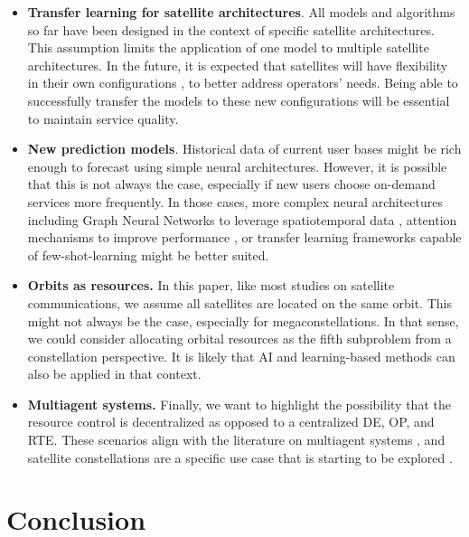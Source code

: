 \documentclass[letterpaper]{article} %
\begin{document}
\begin{itemize}
    \item \textbf{Transfer learning for satellite architectures}. All models and algorithms so far have been designed in the context of specific satellite architectures. This assumption limits the application of one model to multiple satellite architectures. In the future, it is expected that satellites will have flexibility in their own configurations \cite{DeWeck2004OptimalAlgorithm}, to better address operators' needs. Being able to successfully transfer the models to these new configurations will be essential to maintain service quality.
    
    \item \textbf{New prediction models}. Historical data of current user bases might be rich enough to forecast using simple neural architectures. However, it is possible that this is not always the case, especially if new users choose on-demand services more frequently. In those cases, more complex neural architectures including Graph Neural Networks to leverage spatiotemporal data \cite{wang2020traffic}, attention mechanisms to improve performance \cite{Vaswani2017}, or transfer learning frameworks capable of few-shot-learning \cite{Panigrahi2021} might be better suited. 
    
    \item \textbf{Orbits as resources.} In this paper, like most studies on satellite communications, we assume all satellites are located on the same orbit. This might not always be the case, especially for megaconstellations. In that sense, we could consider allocating orbital resources as the fifth subproblem from a constellation perspective. It is likely that AI and learning-based methods can also be applied in that context.
    
    \item \textbf{Multiagent systems.} Finally, we want to highlight the possibility that the resource control is decentralized as opposed to a centralized DE, OP, and RTE. These scenarios align with the literature on multiagent systems \cite{foerster2018counterfactual, Rashid2018}, and satellite constellations are a specific use case that is starting to be explored \cite{he2020load, hu2020multi}.
\end{itemize}








\section{Conclusion}
\end{document}
